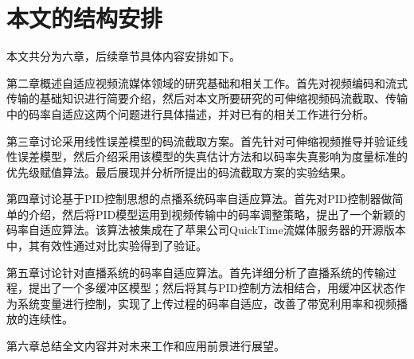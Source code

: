 \section{本文的结构安排}

本文共分为六章，后续章节具体内容安排如下。

第二章概述自适应视频流媒体领域的研究基础和相关工作。首先对视频编码和流式传输的基础知识进行简要介绍，然后对本文所要研究的可伸缩视频码流截取、传输中的码率自适应这两个问题进行具体描述，并对已有的相关工作进行分析。

第三章讨论采用线性误差模型的码流截取方案。首先针对可伸缩视频推导并验证线性误差模型，然后介绍采用该模型的失真估计方法和以码率失真影响为度量标准的优先级赋值算法。最后展现并分析所提出的码流截取方案的实验结果。

第四章讨论基于PID控制思想的点播系统码率自适应算法。首先对PID控制器做简单的介绍，然后将PID模型运用到视频传输中的码率调整策略，提出了一个新颖的码率自适应算法。该算法被集成在了苹果公司QuickTime流媒体服务器的开源版本中，其有效性通过对比实验得到了验证。

第五章讨论针对直播系统的码率自适应算法。首先详细分析了直播系统的传输过程，提出了一个多缓冲区模型；然后将其与PID控制方法相结合，用缓冲区状态作为系统变量进行控制，实现了上传过程的码率自适应，改善了带宽利用率和视频播放的连续性。

第六章总结全文内容并对未来工作和应用前景进行展望。